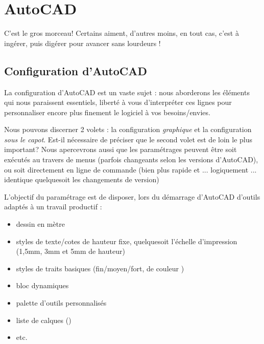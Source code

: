 \documentclass[a4paper,12pt,french]{sphinxmanual}
\begin{document}
\chapter{AutoCAD}
\label{acad/index:index-acad}\label{acad/index::doc}\label{acad/index:autocad}
C'est le gros morceau! Certains aiment, d'autres moins, en tout cas,
c'est à ingérer, puis digérer pour avancer sans lourdeurs !
\begin{quote}
\label{acad/config_acad:config-acad}\end{quote}


\section{Configuration d'AutoCAD}
\label{acad/config_acad:configuration-d-autocad}\label{acad/config_acad::doc}\label{acad/config_acad:config-acad}
La configuration d'AutoCAD est un vaste sujet : nous aborderons les éléments qui nous paraissent essentiels, liberté à vous d'interpréter ces lignes pour personnaliser encore plus finement le logiciel à vos besoins/envies.

Nous pouvons discerner 2 volets : la configuration \emph{graphique} et la configuration \emph{sous le capot}. Est-il nécessaire de préciser que le second volet est de loin le plus important? Nous apercevrons aussi que les paramétrages peuvent être soit exécutés au travers de menus (parfois changeants selon les versions d'AutoCAD), ou soit directement en ligne de commande (bien plus rapide et ... logiquement ... identique quelquesoit les changements de version)

L'objectif du paramétrage est de disposer, lors du démarrage d'AutoCAD d'outils adaptés à un travail productif :
\begin{itemize}
\item {} 
dessin en mètre

\item {} 
styles de texte/cotes de hauteur fixe, quelquesoit l'échelle d'impression (1,5mm, 3mm et 5mm de hauteur)

\item {} 
styles de traits basiques (fin/moyen/fort, de couleur )

\item {} 
bloc dynamiques

\item {} 
palette d'outils personnalisés

\item {} 
liste de calques ()

\item {} 
etc.

\end{itemize}
\end{document}
